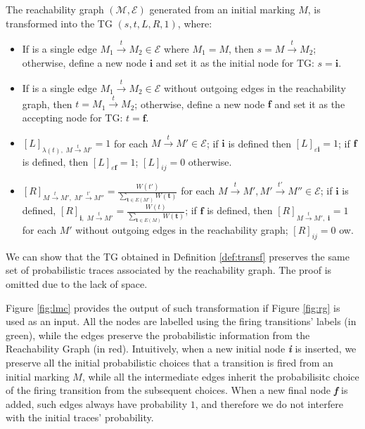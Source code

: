 \begin{definition}\label{def:transf}
The reachability graph $(\mathcal{M},\mathcal{E})$ generated from an initial marking $M$, is transformed into the TG $(s,t,L,R,1)$, where:
\begin{itemize}
	\item If is a single edge $M_1\overset{t}{\to}M_2\in\mathcal{E}$ where $M_1=M$, then $s=M\overset{t}{\to}M_2$; otherwise, define a new node $\textbf{i}$ and set it as the initial node for TG: $s=\textbf{i}$.
	\item If is a single edge $M_1\overset{t}{\to}M_2\in\mathcal{E}$ without outgoing edges in the reachability graph, then $t=M_1\overset{t}{\to}M_2$; otherwise, define a new node $\textbf{f}$ and set it as the accepting node for TG:  $t=\textbf{f}$.
	\item $[L]_{\lambda(t),\;M\overset{t}{\to} M'}=1$ for each $M\overset{t}{\to} M'\in\mathcal{E}$; if $\textbf{i}$ is defined then $[L]_{\varepsilon\textbf{i}}=1$; if $\textbf{f}$ is defined, then $[L]_{\varepsilon\textbf{f}}=1$; $[L]_{ij}=0$ otherwise.
	\item $[R]_{M\overset{t}{\to} M',\;M'\overset{t'}{\to} M''}=\frac{W(t')}{\sum_{\textbf{t}\in E(M')}W(\textbf{t})}$ for each $M\overset{t}{\to} M',M'\overset{t'}{\to} M''\in\mathcal{E}$; if $\textbf{i}$ is defined, $[R]_{\textbf{i},\;M\overset{t}{\to}M'}=\frac{W(t)}{\sum_{\textbf{t}\in E(M)}W(\textbf{t})}$; if $\textbf{f}$ is defined, then $[R]_{M\overset{t}{\to}M',\;\textbf{i}}=1$ for each $M'$ without outgoing edges in the reachability graph; $[R]_{ij}=0$ ow.
\end{itemize}
\end{definition}
%
We can show that the TG obtained in Definition \ref{def:transf} preserves the same set of probabilistic traces associated by the reachability graph. The proof is omitted due to the lack of space.

\begin{example}
Figure \ref{fig:lmc} provides the output of such transformation if Figure \ref{fig:rg} is used as an input. All the nodes are labelled using the firing transitions' labels (in green), while the edges preserve the probabilistic information from the Reachability Graph (in red). Intuitively, when a new initial node \textit{\textbf{i}} is inserted, we preserve all the initial probabilistic choices that a transition is fired from an initial marking $M$, while all the intermediate edges inherit the probabilisitc choice of the firing transition from the subsequent choices. When a new final node \textit{\textbf{f}} is added, such edges always have probability $1$, and therefore we do not interfere with the initial traces' probability.
\end{example}

